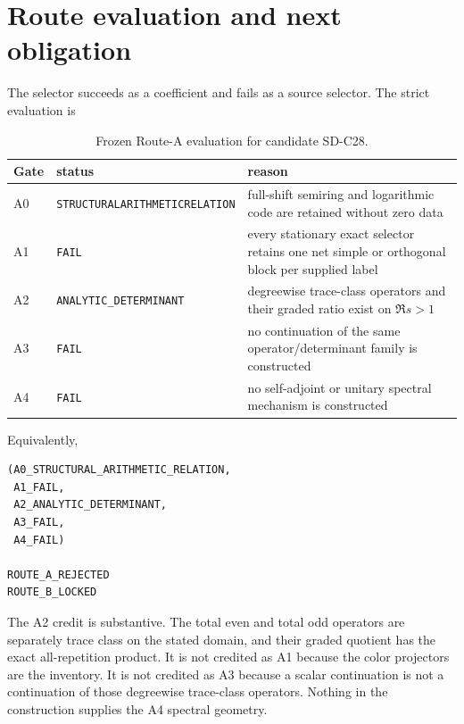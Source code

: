 \section{Route evaluation and next obligation}
\label{sec:route}

The selector succeeds as a coefficient and fails as a source selector.  The
strict evaluation is

\begin{table}[H]
\centering
\small
\caption{Frozen Route-A evaluation for candidate SD-C28.}
\label{tab:route-evaluation}
\begin{tabularx}{\textwidth}{L{17mm} L{42mm} Y}
\toprule
Gate & status & reason \\
\midrule
A0 & \texttt{STRUCTURAL}\newline\texttt{ARITHMETIC}\newline\texttt{RELATION} & full-shift semiring and logarithmic code are retained without zero data \\
A1 & \texttt{FAIL} & every stationary exact selector retains one net simple or orthogonal block per supplied label \\
A2 & \texttt{ANALYTIC\_DETERMINANT} & degreewise trace-class operators and their graded ratio exist on \(\Re s>1\) \\
A3 & \texttt{FAIL} & no continuation of the same operator/determinant family is constructed \\
A4 & \texttt{FAIL} & no self-adjoint or unitary spectral mechanism is constructed \\
\bottomrule
\end{tabularx}
\end{table}

Equivalently,
\begin{samepage}
\begin{verbatim}
(A0_STRUCTURAL_ARITHMETIC_RELATION,
 A1_FAIL,
 A2_ANALYTIC_DETERMINANT,
 A3_FAIL,
 A4_FAIL)

ROUTE_A_REJECTED
ROUTE_B_LOCKED
\end{verbatim}
\end{samepage}

The A2 credit is substantive.  The total even and total odd operators are
separately trace class on the stated domain, and their graded quotient has the
exact all-repetition product.  It is not credited as A1 because the color
projectors are the inventory.  It is not credited as A3 because a scalar
continuation is not a continuation of those degreewise trace-class
operators.  Nothing in the construction supplies the A4 spectral geometry.

